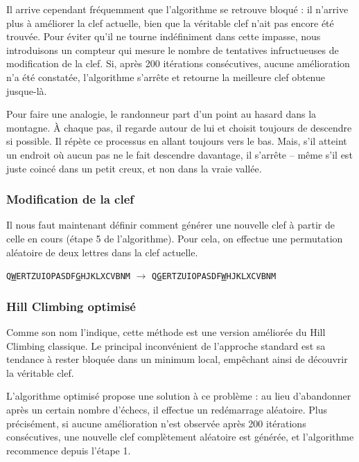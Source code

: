 \documentclass[a4paper]{article}
\begin{document}
Il arrive cependant fréquemment que l’algorithme se retrouve bloqué : il n’arrive plus à améliorer la clef actuelle, bien que la véritable clef n’ait pas encore été trouvée.  
Pour éviter qu’il ne tourne indéfiniment dans cette impasse, nous introduisons un compteur qui mesure le nombre de tentatives infructueuses de modification de la clef.  
Si, après 200 itérations consécutives, aucune amélioration n’a été constatée, l’algorithme s’arrête et retourne la meilleure clef obtenue jusque-là.


Pour faire une analogie, le randonneur part d’un point au hasard dans la montagne. À chaque pas, il regarde autour de lui et choisit toujours de descendre si possible. Il répète ce processus en allant toujours vers le bas. Mais, s’il atteint un endroit où aucun pas ne le fait descendre davantage, il s’arrête – même s’il est juste coincé dans un petit creux, et non dans la vraie vallée.
\subsubsection*{Modification de la clef}\label{sec:modification_de_la_clef}

Il nous faut maintenant définir comment générer une nouvelle clef à partir de celle en cours (étape 5 de l’algorithme).  
Pour cela, on effectue une permutation aléatoire de deux lettres dans la clef actuelle.

\begin{center}
\texttt{Q\underline{W}ERTZUIOPASDF\underline{G}HJKLXCVBNM} $\rightarrow$ \texttt{Q\underline{G}ERTZUIOPASDF\underline{W}HJKLXCVBNM}
\end{center}


\subsubsection{Hill Climbing optimisé}

Comme son nom l’indique, cette méthode est une version améliorée du Hill Climbing classique.  
Le principal inconvénient de l’approche standard est sa tendance à rester bloquée dans un minimum local, empêchant ainsi de découvrir la véritable clef.

L’algorithme optimisé propose une solution à ce problème : au lieu d’abandonner après un certain nombre d’échecs, il effectue un redémarrage aléatoire.  
Plus précisément, si aucune amélioration n’est observée après 200 itérations consécutives, une nouvelle clef complètement aléatoire est générée, et l’algorithme recommence depuis l’étape 1.
\end{document}
